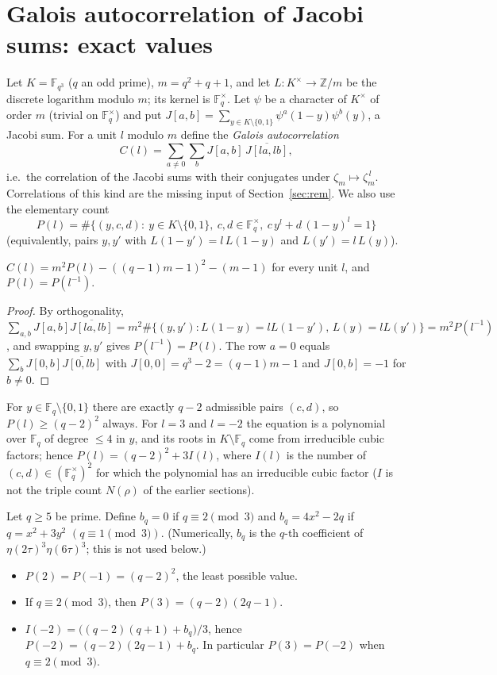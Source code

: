 \section{Galois autocorrelation of Jacobi sums: exact values}\label{sec:gal}
Let $K=\mathbb F_{q^3}$ ($q$ an odd prime), $m=q^2+q+1$, and let $L:K^\times\to\mathbb Z/m$ be the discrete logarithm modulo $m$; its kernel is
$\mathbb F_q^\times$. Let $\psi$ be a character of $K^\times$ of order $m$ (trivial on $\mathbb F_q^\times$) and put
$J[a,b]=\sum_{y\in K\setminus\{0,1\}}\psi^a(1-y)\psi^b(y)$, a Jacobi sum. For a unit $l$ modulo $m$ define the \emph{Galois autocorrelation}
\[C(l)=\sum_{a\ne0}\sum_{b}J[a,b]\,\overline{J[la,lb]},\]
i.e.\ the correlation of the Jacobi sums with their conjugates under $\zeta_m\mapsto\zeta_m^{\,l}$. Correlations of this kind are the
missing input of Section~\ref{sec:rem}. We also use the elementary count
\[P(l)=\#\{(y,c,d):\ y\in K\setminus\{0,1\},\ c,d\in\mathbb F_q^\times,\ c\,y^l+d\,(1-y)^l=1\}\]
(equivalently, pairs $y,y'$ with $L(1-y')=l\,L(1-y)$ and $L(y')=l\,L(y)$).

\begin{proposition}\label{prop:gal}
$C(l)=m^2P(l)-((q-1)m-1)^2-(m-1)$ for every unit $l$, and $P(l)=P(l^{-1})$.
\end{proposition}
\begin{proof}
By orthogonality, $\sum_{a,b}J[a,b]\overline{J[la,lb]}=m^2\#\{(y,y'):L(1-y)=lL(1-y'),\,L(y)=lL(y')\}=m^2P(l^{-1})$, and swapping $y,y'$ gives
$P(l^{-1})=P(l)$. The row $a=0$ equals $\sum_b J[0,b]\overline{J[0,lb]}$ with $J[0,0]=q^3-2=(q-1)m-1$ and $J[0,b]=-1$ for $b\ne0$.
\end{proof}

For $y\in\mathbb F_q\setminus\{0,1\}$ there are exactly $q-2$ admissible pairs $(c,d)$, so $P(l)\ge(q-2)^2$ always. For $l=3$ and $l=-2$
the equation is a polynomial over $\mathbb F_q$ of degree $\le4$ in $y$, and its roots in $K\setminus\mathbb F_q$ come from irreducible cubic factors; hence
$P(l)=(q-2)^2+3I(l)$, where $I(l)$ is the number of $(c,d)\in(\mathbb F_q^\times)^2$ for which the polynomial has an irreducible cubic factor
($I$ is not the triple count $N(\rho)$ of the earlier sections).

\begin{theorem}\label{thm:gal}
Let $q\ge5$ be prime. Define $b_q=0$ if $q\equiv2\pmod3$ and $b_q=4x^2-2q$ if $q=x^2+3y^2$ $(q\equiv1\pmod3)$.
(Numerically, $b_q$ is the $q$-th coefficient of $\eta(2\tau)^3\eta(6\tau)^3$; this is not used below.)
\begin{itemize}
\item[(a)] $P(2)=P(-1)=(q-2)^2$, the least possible value.
\item[(b)] If $q\equiv2\pmod3$, then $P(3)=(q-2)(2q-1)$.
\item[(c)] $I(-2)=\big((q-2)(q+1)+b_q\big)/3$, hence $P(-2)=(q-2)(2q-1)+b_q$. In particular $P(3)=P(-2)$ when $q\equiv2\pmod3$.
\end{itemize}
\end{theorem}

